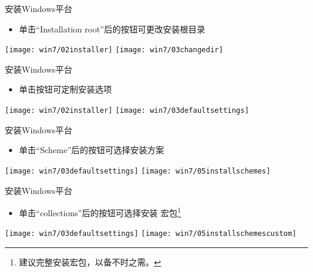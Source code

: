 \documentclass[fontset = none, t]{ctexbeamer}
\begin{document}
\begin{frame}{安装\tl}{Windows平台}
  \begin{spacing}{1.8}
    \begin{itemize}
    \item 单击\enquote{Installation root}后的按钮可更改\alert{安装根目录}
    \end{itemize}  
    \begin{center}
      \texttt{[image: win7/02installer]}
      \texttt{[image: win7/03changedir]}
    \end{center}
  \end{spacing}
\end{frame}

\begin{frame}{安装\tl}{Windows平台}
  \begin{spacing}{1.8}
    \begin{itemize}
    \item 单击按钮可定制安装选项
    \end{itemize}  
    \begin{center}
      \texttt{[image: win7/02installer]}
      \texttt{[image: win7/03defaultsettings]}
    \end{center}
  \end{spacing}
\end{frame}

\begin{frame}{安装\tl}{Windows平台}
  \begin{spacing}{1.8}
    \begin{itemize}
    \item 单击\enquote{Scheme}后的按钮可选择安装方案
    \end{itemize}  
    \begin{center}
      \texttt{[image: win7/03defaultsettings]}
      \texttt{[image: win7/05installschemes]}
    \end{center}
  \end{spacing}
\end{frame}

\begin{frame}{安装\tl}{Windows平台}
  \begin{spacing}{1.8}
    \begin{itemize}
    \item 单击\enquote{collections}后的按钮可选择安装
      宏包\footnote[frame,1]{建议完整安装宏包，以备不时之需。}
    \end{itemize}  
    \begin{center}
      \texttt{[image: win7/03defaultsettings]}
      \texttt{[image: win7/05installschemescustom]}
    \end{center}
  \end{spacing}
\end{frame}
\end{document}

